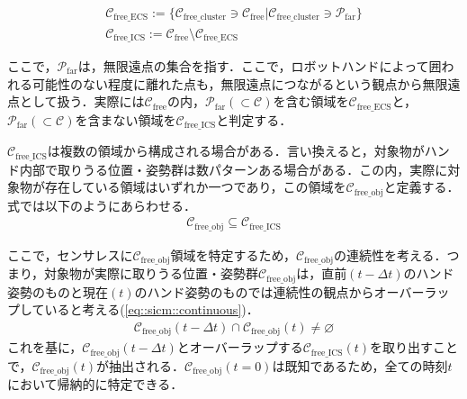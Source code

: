 \documentclass[a4paper,twoside,12pt,papersize, dvipdfmx]{iirthesis}
\begin{document}
\begin{gather}
\mathcal{C}_{\mathrm{free\_ECS}} := 
 \{\mathcal{C}_{\mathrm{free\_cluster}} \ni \mathcal{C}_{\mathrm {free}} | \mathcal{C}_{\mathrm{free\_cluster}} \ni \mathcal{P}_{\mathrm {far}}\} \\
\mathcal{C}_{\mathrm{free\_ICS}} := \mathcal{C}_{\mathrm{free}} 
\setminus \mathcal{C}_{\mathrm{free\_ECS}}
\end{gather}

ここで，$\mathcal{P}_{\mathrm{far}}$は，無限遠点の集合を指す．ここで，ロボットハンドによって囲われる可能性のない程度に離れた点も，無限遠点につながるという観点から無限遠点として扱う．実際には$\mathcal{C}_{\mathrm{free}}$の内，$\mathcal{P}_{\mathrm{far}} (\subset \mathcal{C})$を含む領域を$\mathcal{C}_{\mathrm{free\_ECS}}$と，$\mathcal{P}_{\mathrm{far}} (\subset \mathcal{C})$を含まない領域を$\mathcal{C}_{\mathrm{free\_ICS}}$と判定する．\par

$\mathcal{C}_{\mathrm{free\_ICS}}$は複数の領域から構成される場合がある．言い換えると，対象物がハンド内部で取りうる位置・姿勢群は数パターンある場合がある．この内，実際に対象物が存在している領域はいずれか一つであり，この領域を$\mathcal{C}_{\mathrm{free\_obj}}$と定義する．式では以下のようにあらわせる．
\begin{gather}
\mathcal{C}_{\mathrm{free\_obj}} \subseteq \mathcal{C}_{\mathrm{free\_ICS}}
\end{gather}

ここで，センサレスに$\mathcal{C}_{\mathrm{free\_obj}}$領域を特定するため，$\mathcal{C}_{\mathrm{free\_obj}}$の連続性を考える．つまり，対象物が実際に取りうる位置・姿勢群$\mathcal{C}_{\mathrm{free\_obj}}$は，直前$(t-\Delta t)$のハンド姿勢のものと現在$(t)$のハンド姿勢のものでは連続性の観点からオーバーラップしていると考える(\eqref{eq::sicm::continuous})．
\begin{gather}\label{eq::sicm::continuous}
\mathcal{C}_{\mathrm{free\_obj}}(t-\Delta t) \cap 
\mathcal{C}_{\mathrm{free\_obj}}(t) \neq \varnothing
\end{gather}
これを基に，$\mathcal{C}_{\mathrm{free\_obj}}(t-\Delta t)$とオーバーラップする$\mathcal{C}_{\mathrm{free\_ICS}}(t)$を取り出すことで，$\mathcal{C}_{\mathrm{free\_obj}}(t)$が抽出される．$\mathcal{C}_{\mathrm{free\_obj}}(t=0)$は既知であるため，全ての時刻$t$において帰納的に特定できる．
\end{document}
